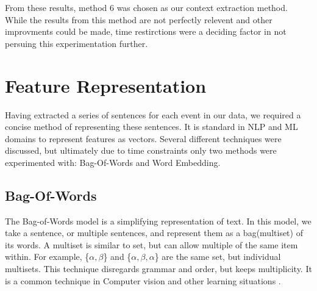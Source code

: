 \documentclass[bsc,frontabs,twoside,singlespacing,parskip,deptreport]{infthesis}     %
\begin{document}
From these results, method 6 was chosen as our context extraction method. While the
results from this method are not perfectly relevent and other improvments could be made,
time restirctions were a deciding factor in not persuing this experimentation further.

\section{Feature Representation}\label{sec:representation}
Having extracted a series of sentences for each event in our data, we required a concise method
of representing these sentences. It is standard in NLP and ML domains to represent features as vectors.
Several different techniques were discussed, but ultimately due to time constraints only two methods were
experimented with: Bag-Of-Words and Word Embedding.
\subsection{Bag-Of-Words}
The Bag-of-Words model is a simplifying representation of text.
In this model, we take a sentence, or multiple sentences, and represent them as a bag(multiset) of its words.
A multiset is similar to set, but can allow multiple of the same item within.
For example, \{$\alpha,\beta$\} and \{$\alpha,\beta,\alpha$\} are the same set, but individual multisets.
This technique disregards grammar and order, but keeps multiplicity. It is a common technique in Computer vision
and other learning situations \cite{}.
\end{document}
